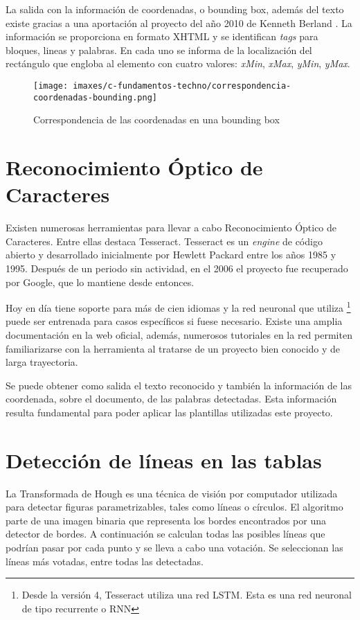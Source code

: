 La salida con la información de coordenadas, o bounding box, además del texto existe gracias a una aportación al proyecto del año 2010 de Kenneth Berland \cite{kenneth_berland_poppler_2010}. La información se proporciona en formato XHTML y se identifican \emph{tags} para bloques, lineas y palabras. En cada uno se informa de la localización del rectángulo que engloba al elemento con cuatro valores: \emph{xMin}, \emph{xMax}, \emph{yMin}, \emph{yMax}.

\begin{figure}[hp!]
	\centering
	\texttt{[image: imaxes/c-fundamentos-techno/correspondencia-coordenadas-bounding.png]}
	\caption{Correspondencia de las coordenadas en una bounding box}
	\label{fig:bounding-box}
\end{figure}

\section{Reconocimiento Óptico de Caracteres}

Existen numerosas herramientas para llevar a cabo Reconocimiento Óptico de Caracteres. Entre ellas destaca Tesseract. Tesseract es un \emph{engine} de código abierto y desarrollado inicialmente por Hewlett Packard entre los años 1985 y 1995. Después de un periodo sin actividad, en el 2006 el proyecto fue recuperado por Google, que lo mantiene desde entonces.

Hoy en día tiene soporte para más de cien idiomas y la red neuronal que utiliza \footnote{Desde la versión 4, Tesseract utiliza una red LSTM. Esta es una red neuronal de tipo recurrente o RNN} puede ser entrenada para casos específicos si fuese necesario. Existe una amplia documentación en la web oficial, además, numerosos tutoriales en la red permiten familiarizarse con la herramienta al tratarse de un proyecto bien conocido y de larga trayectoria.

Se puede obtener como salida el texto reconocido y también la información de las coordenada, sobre el documento, de las palabras detectadas. Esta información resulta fundamental para poder aplicar las plantillas utilizadas este proyecto.

\section{Detección de líneas en las tablas}

La Transformada de Hough es una técnica de visión por computador utilizada para detectar figuras parametrizables, tales como líneas o círculos. El algoritmo parte de una imagen binaria que representa los bordes encontrados por una detector de bordes. A continuación se calculan todas las posibles líneas que podrían pasar por cada punto y se lleva a cabo una votación. Se seleccionan las líneas más votadas, entre todas las detectadas.

